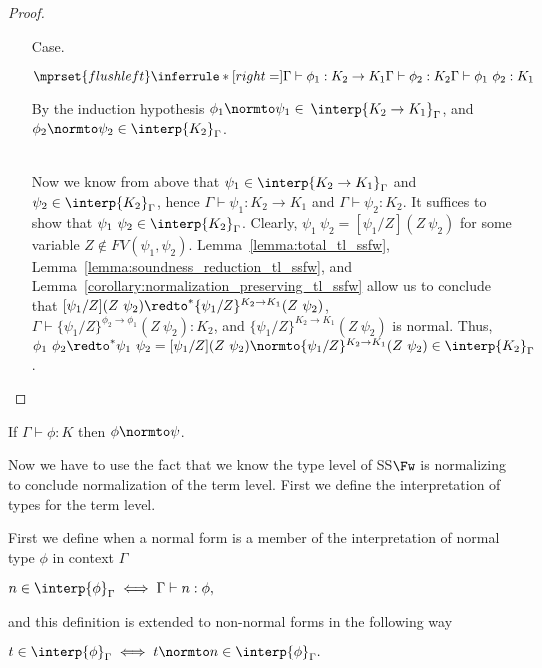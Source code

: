 \begin{proof}
\begin{itemize}
  \item[Case.]\ \\
    \begin{center}
      \begin{math}
        $$\mprset{flushleft}
        \inferrule* [right=] {
          \Gamma \vdash \phi_1 : K_2 \rightarrow K_1 
          \\
          \Gamma \vdash \phi_2 : K_2
        }{\Gamma \vdash \phi_1\ \phi_2 : K_1}
      \end{math}
    \end{center}
    By the induction hypothesis $\phi_1 \normto \psi_1 \in $ $\interp{K_2 \rightarrow K_1}_\Gamma$, and $\phi_2 \normto \psi_2 \in
    \interp{K_2}_\Gamma$.
    
    \ \\
    Now we know from above that $\psi_1 \in \interp{K_2 \rightarrow K_1}_\Gamma$ and
    $\psi_2 \in \interp{K_2}_\Gamma$, hence $\Gamma \vdash \psi_1:K_2 \to K_1$ and
    $\Gamma \vdash \psi_2:K_2$.  It suffices to show that $\psi_1\ \psi_2 \in \interp{K_2}_\Gamma$.
    Clearly, $\psi_1\ \psi_2 = [\psi_1/Z](Z\ \psi_2)$ for some variable $Z \not \in FV(\psi_1,\psi_2)$.  
    Lemma~\ref{lemma:total_tl_ssfw}, Lemma~\ref{lemma:soundness_reduction_tl_ssfw}, 
    and Lemma~\ref{corollary:normalization_preserving_tl_ssfw} allow us to conclude that 
    $[\psi_1/Z](Z\ \psi_2) \redto^* \{\psi_1/Z\}^{K_2 \to K_1}(Z\ \psi_2)$, $\Gamma \vdash \{\psi_1/Z\}^{\phi_2 \to \phi_1}(Z\ \psi_2):K_2$,
    and $\{\psi_1/Z\}^{K_2 \to K_1}(Z\ \psi_2)$ is normal.  Thus, 
    $\phi_1\ \phi_2 \redto^* \psi_1\ \psi_2 = [\psi_1/Z](Z\ \psi_2) \normto \{\psi_1/Z\}^{K_2 \to K_1}(Z\ \psi_2) \in \interp{K_2}_\Gamma$.
  \end{itemize}
\end{proof}
\begin{corollary}[Normalization]
  \label{coro:normalization_type_level_ssfw}
  If $\Gamma \vdash \phi:K$ then $\phi \normto \psi$.
\end{corollary}

Now we have to use the fact that we know the type level of SS$\Fw$ is
normalizing to conclude normalization of the term level.  First we
define the interpretation of types for the term level.

\begin{definition}
  \label{def:interpretation_of_types_stlc}
  First we define when a normal form is a member of the interpretation of normal type $\phi$ in context $\Gamma$
  \begin{center}
    \begin{math}
    n \in \interp{\phi}_\Gamma \iff \Gamma \vdash n:\phi,
  \end{math}
  \end{center}
  and this definition is extended to non-normal forms in the following way
  \begin{center}
    \begin{math}
    t \in \interp{\phi}_\Gamma \iff t \normto n \in \interp{\phi}_\Gamma.
  \end{math}
  \end{center}
\end{definition}

